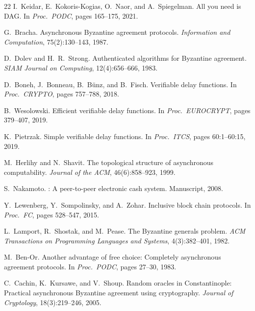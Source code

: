 \documentclass[11pt,a4paper]{article}
\theoremstyle{definition}
\theoremstyle{remark}
\begin{document}
\begin{thebibliography}{22}
I.~Keidar, E.~Kokoris-Kogias, O.~Naor, and A.~Spiegelman.
\newblock All you need is {DAG}.
\newblock In \emph{Proc.\ PODC}, pages 165--175, 2021.

G.~Bracha.
\newblock Asynchronous {Byzantine} agreement protocols.
\newblock \emph{Information and Computation}, 75(2):130--143, 1987.

D.~Dolev and H.~R.~Strong.
\newblock Authenticated algorithms for {Byzantine} agreement.
\newblock \emph{SIAM Journal on Computing}, 12(4):656--666, 1983.

D.~Boneh, J.~Bonneau, B.~B{\"u}nz, and B.~Fisch.
\newblock Verifiable delay functions.
\newblock In \emph{Proc.\ CRYPTO}, pages 757--788, 2018.

B.~Wesolowski.
\newblock Efficient verifiable delay functions.
\newblock In \emph{Proc.\ EUROCRYPT}, pages 379--407, 2019.

K.~Pietrzak.
\newblock Simple verifiable delay functions.
\newblock In \emph{Proc.\ ITCS}, pages 60:1--60:15, 2019.

M.~Herlihy and N.~Shavit.
\newblock The topological structure of asynchronous computability.
\newblock \emph{Journal of the ACM}, 46(6):858--923, 1999.

S.~Nakamoto.
: A peer-to-peer electronic cash system.
\newblock Manuscript, 2008.

Y.~Lewenberg, Y.~Sompolinsky, and A.~Zohar.
\newblock Inclusive block chain protocols.
\newblock In \emph{Proc.\ FC}, pages 528--547, 2015.

L.~Lamport, R.~Shostak, and M.~Pease.
\newblock The {Byzantine} generals problem.
\newblock \emph{ACM Transactions on Programming Languages and Systems},
4(3):382--401, 1982.

M.~Ben-Or.
\newblock Another advantage of free choice: Completely asynchronous agreement protocols.
\newblock In \emph{Proc.\ PODC}, pages 27--30, 1983.

C.~Cachin, K.~Kursawe, and V.~Shoup.
\newblock Random oracles in {Constantinople}: Practical asynchronous {Byzantine} agreement using cryptography.
\newblock \emph{Journal of Cryptology}, 18(3):219--246, 2005.

\end{thebibliography}
\end{document}
